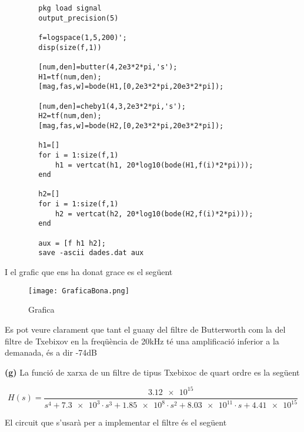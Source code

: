 \documentclass[12pt, a4papre]{article}
\begin{document}
	\begin{lstlisting}
		pkg load signal
		output_precision(5)

		f=logspace(1,5,200)';
		disp(size(f,1))

		[num,den]=butter(4,2e3*2*pi,'s');
		H1=tf(num,den);
		[mag,fas,w]=bode(H1,[0,2e3*2*pi,20e3*2*pi]);

		[num,den]=cheby1(4,3,2e3*2*pi,'s');
		H2=tf(num,den);
		[mag,fas,w]=bode(H2,[0,2e3*2*pi,20e3*2*pi]);

		h1=[]
		for i = 1:size(f,1)
  			h1 = vertcat(h1, 20*log10(bode(H1,f(i)*2*pi)));
		end

		h2=[]
		for i = 1:size(f,1)
  			h2 = vertcat(h2, 20*log10(bode(H2,f(i)*2*pi)));
		end

		aux = [f h1 h2];
		save -ascii dades.dat aux
	\end{lstlisting}
	
	I el grafic que ens ha donat grace es el següent
	\begin{figure}[t]
		\texttt{[image: GraficaBona.png]}	
		\caption{Grafica}
		\label{fig: label}
	\end{figure}
	\newpage
	
	Es pot veure clarament que tant el guany del filtre de Butterworth com la del filtre de Txebixov en la freqüència de 20kHz té una amplificació
	inferior a la demanada, és a dir -74dB
	
	\textbf{(g)} La funció de xarxa de un filtre de tipus Txebixoc de quart ordre es la següent
	
	\[
		H(s)=\frac{\num{3.12e15}}{s^4+\num{7.3e3}\cdot s^3+\num{1.85e8}\cdot s^2 +\num{8.03e11} \cdot s +\num{4.41e15}}
	\]
	
	El circuit que s'usarà per a implementar el filtre és el següent
	
\end{document}
